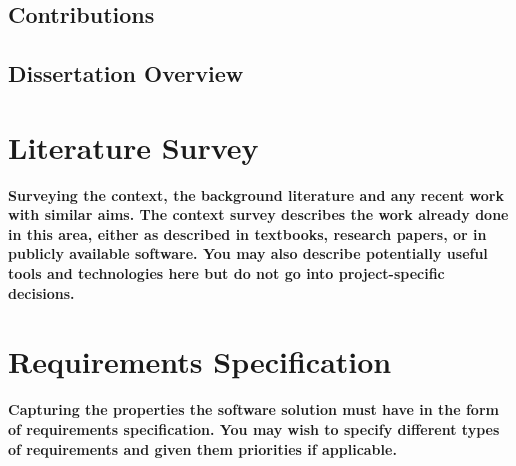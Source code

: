 \documentclass{article}
\begin{document}
\subsection{Contributions}

\subsection{Dissertation Overview}


\section{Literature Survey}
\textbf{Surveying the context, the background literature and any
recent work with similar aims. The context survey
describes the work already done in this area, either as
described in textbooks, research papers, or in publicly
available software. You may also describe potentially
useful tools and technologies here but do not go into
project-specific decisions.} \\




\section{Requirements Specification}
\textbf{Capturing the properties the software solution must have
in the form of requirements specification. You may wish
to specify different types of requirements and given them
priorities if applicable.}
\end{document}
